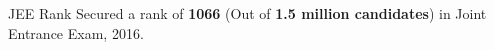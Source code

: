 
\begin{misc}


\cvskill
    {JEE Rank} %
    {{Secured a rank of }\textbf{1066} { (Out of \textbf{1.5 million candidates}) }{in Joint Entrance Exam, 2016.}}
 



\end{misc}

